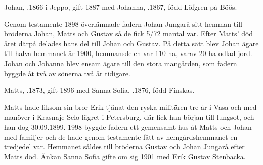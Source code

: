 Johan, .1866 i Jeppo, gift 1887 med Johanna, .1867, född Löfgren på Böös.
\begin{jhchildren}
  \item {}
  \item {}
  \item {}
  \item {}
  \item {}
  \item {}
\end{jhchildren}
Genom testamente 1898 överlämnade fadern Johan Jungarå sitt hemman till bröderna Johan, Matts och Gustav så de fick 5/72 mantal var. Efter Matts' död året därpå delades hans del till Johan och Gustav. På detta sätt blev Johan ägare till halva hemmanet år 1900, hemmansdelen var 110 ha, varav 20 ha odlad jord. Johan och Johanna blev ensam ägare till den stora mangården, som fadern byggde åt två av sönerna två år tidigare.


Matts, .1873, gift 1896 med Sanna Sofia, .1876, född Finskas.
\begin{jhchildren}
  \item {}
  \item {}
\end{jhchildren}
Matts hade liksom sin bror Erik tjänat den ryska militären tre år i Vasa och med manöver i Krasnaje Selo-lägret i Petersburg, där fick han början till lungsot, och han dog 30.09.1899. 1998 byggde fadern ett gemensamt hus åt Matts och Johan med familjer och de hade genom testamente fått av hemgårdshemmanet en tredjedel var. Hemmanet såldes till bröderna Gustav och Johan Jungarå efter Matts död. Änkan Sanna Sofia gifte om sig 1901 med Erik Gustav Stenbacka.



